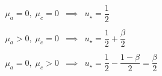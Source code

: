 \documentclass[aps,12pt]{revtex4}
\begin{document}
\begin{equation}
\begin{array}{lcl}
\mu_a = 0, \;\mu_c = 0 & \implies & u_\star = \dfrac{1}{2}\\
\\
\mu_a > 0, \;\mu_c = 0 & \implies & u_\star = \dfrac{1}{2} + \dfrac{\beta}{2} \\
\\
\mu_a = 0, \;\mu_c > 0 & \implies & u_\star = \dfrac{1}{2} - \dfrac{1-\beta}{2} = \dfrac{\beta}{2} \\
\end{array}
\end{equation}
\end{document}
